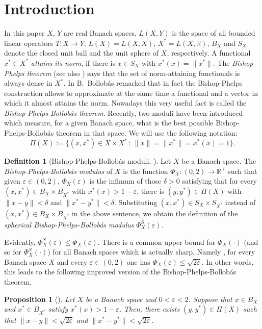\documentclass[11pt,a4paper]{amsart}
\newcommand{\R}{{\mathbb{R}}}
\newcommand{\eps}{\varepsilon}
\numberwithin{equation}{section}
\theoremstyle{plain}
\newtheorem{prop}[theorem]{Proposition}
\theoremstyle{definition}
\newtheorem{definition}[theorem]{Definition}
\renewcommand{\leq}{\leqslant}
\begin{document}

\section{Introduction}
In this paper $X$, $Y$ are real Banach spaces,  $L(X,Y)$ is the space of all bounded linear operators $T\colon X \to Y$, $L(X) = L(X,X)$, $X^* = L(X,\R)$, $B_X$ and $S_X$ denote the closed unit ball and the unit sphere of $X$, respectively. 
A functional $x^* \in X^*$ \emph{attains its norm}, if there is $x \in S_X$ with $x^*(x) = \|x^*\|$.  
The \emph{Bishop-Phelps theorem} \cite{Bishop-Phelps} (see also \cite[Chapter 1, p. 3]{Diestel}) says that the set of norm-attaining functionals is always dense in $X^*$. In  \cite{Bollobas} B.~Bollob\'{a}s  remarked that in fact the  Bishop-Phelps construction allows to approximate at the same time a functional and a vector in which it almost attains the norm. Nowadays this very useful fact is called the \emph{ Bishop-Phelps-Bollob\'{a}s theorem}.  Recently, two moduli have been introduced \cite{Modul2014} which measure, for a given Banach space, what is the best possible Bishop-Phelps-Bollob\'{a}s theorem in that space. We will use the following notation:
$$
\Pi(X):=\bigl\{(x,x^*)\in X\times X^*\,:\,
\|x\|=\|x^*\|=x^*(x)=1\bigr\}.
$$
\begin{definition}[Bishop-Phelps-Bollob\'{a}s moduli, \cite{Modul2014}] \label{def1.2bpb-mod}  Let $X$ be a Banach space. The \emph{Bishop-Phelps-Bollob\'{a}s modulus} of $X$ is the function $\Phi_X:(0,2)\longrightarrow \R^+$ such that given $\eps\in (0,2)$, $\Phi_X(\eps)$ is the infimum of those $\delta>0$ satisfying that for every $(x,x^*)\in B_X\times B_{X^*}$ with $ x^*(x)>1-\eps$, there is $(y,y^*)\in \Pi(X)$ with  $\|x-y\|<\delta$ and $\|x^*-y^*\|<\delta$. 
Substituting $(x,x^*)\in S_X\times S_{X^*}$ instead of $(x,x^*)\in B_X\times B_{X^*}$  in the above sentence, we obtain the definition of the \emph{spherical Bishop-Phelps-Bollob\'{a}s modulus}   $\Phi^S_X(\eps)$. 
\end{definition}
Evidently, $\Phi^S_X(\eps)\leq\Phi_X(\eps)$.
There is a common upper bound for $\Phi_X(\cdot)$ (and so for $\Phi_X^S(\cdot)$) for all Banach spaces which is actually sharp. Namely \cite{Modul2014},  for every Banach space $X$ and every $\eps\in (0,2)$ one has
$\Phi_X(\eps)\leq \sqrt{2\eps}$. In other words, this leads to the following improved version of the Bishop-Phelps-Bollob\'{a}s theorem.

\begin{prop}[\mbox{\cite[Corollary~2.4]{Modul2014}}] \label{Prop1.2}
Let $X$ be a Banach space and $0<\eps<2$. Suppose that $x\in B_X$ and $x^*\in B_{X^*}$ satisfy $x^*(x) > 1- \eps$. Then, there exists $(y,y^*)\in \Pi(X)$ such that $\|x-y\|<\sqrt{2\eps}$ and $\|x^*-y^*\|<\sqrt{2\eps}$.
\end{prop}
\end{document}
